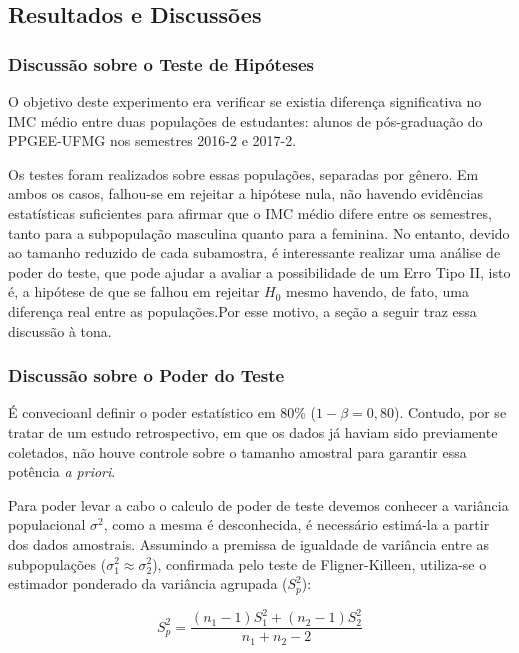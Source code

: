 \documentclass[
]{article}
\begin{document}
\subsection{Resultados e Discussões}\label{resultados-e-discussuxf5es}

\subsubsection{Discussão sobre o Teste de Hipóteses}\label{discussuxe3o-sobre-o-teste-de-hipuxf3teses}

O objetivo deste experimento era verificar se existia diferença significativa no IMC médio entre duas populações de estudantes: alunos de pós-graduação do PPGEE-UFMG nos semestres 2016-2 e 2017-2.

Os testes foram realizados sobre essas populações, separadas por gênero. Em ambos os casos, falhou-se em rejeitar a hipótese nula, não havendo evidências estatísticas suficientes para afirmar que o IMC médio difere entre os semestres, tanto para a subpopulação masculina quanto para a feminina. No entanto, devido ao tamanho reduzido de cada subamostra, é interessante realizar uma análise de poder do teste, que pode ajudar a avaliar a possibilidade de um Erro Tipo II, isto é, a hipótese de que se falhou em rejeitar \(H_0\) mesmo havendo, de fato, uma diferença real entre as populações.Por esse motivo, a seção a seguir traz essa discussão à tona.

\subsubsection{Discussão sobre o Poder do Teste}\label{discussuxe3o-sobre-o-poder-do-teste}

É convecioanl definir o poder estatístico em 80\% (\(1 - \beta = 0{,}80\)). Contudo, por se tratar de um estudo retrospectivo, em que os dados já haviam sido previamente coletados, não houve controle sobre o tamanho amostral para garantir essa potência \emph{a priori}.

Para poder levar a cabo o calculo de poder de teste devemos conhecer a variância populacional \(\sigma^2\), como a mesma é desconhecida, é necessário estimá-la a partir dos dados amostrais. Assumindo a premissa de igualdade de variância entre as subpopulações (\(\sigma_1^2 \approx \sigma_2^2\)), confirmada pelo teste de Fligner-Killeen, utiliza-se o estimador ponderado da variância agrupada (\(S_p^2\)):

\begin{equation}
S_p^2 = \frac{(n_1 - 1)S_1^2 + (n_2 - 1)S_2^2}{n_1 + n_2 - 2}
\label{eq:var-agrupada}
\end{equation}
\end{document}
